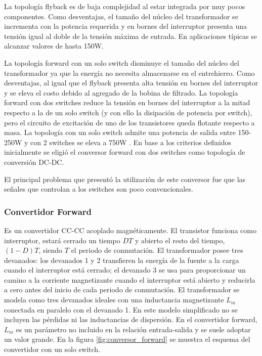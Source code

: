 La topología flyback es de baja complejidad al estar integrada por muy pocos componentes. 
Como desventajas, el tamaño del núcleo del transformador se incrementa con la potencia requerida y en bornes del
interruptor presenta una tensión igual al doble de la tensión máxima de entrada.
En aplicaciones típicas se alcanzar valores de hasta 150W.

La topología forward con un solo switch disminuye el tamaño del núcleo del transformador ya que la energía no necesita almacenarse en el entrehierro.
Como desventajas, al igual que el flyback presenta alta tensión en bornes del interruptor y se eleva el costo debido al agregado de la bobina de filtrado.
La topología forward con dos switches reduce la tensión en bornes del interruptor a la mitad respecto a la de un solo switch (y con ello la disipación de potencia por switch), 
pero el circuito de excitación de uno de los transistores queda flotante respecto a masa. 
La topología con un solo switch admite una potencia de salida entre 150-250W y con 2 switches se eleva a 750W \cite{mohan}\cite{hart}. 
En base a los criterios definidos inicialmente se eligió el conversor forward con dos switches como topología de conversión DC-DC. 

El principal problema que presentó la utilización de este conversor fue que las señales que controlan a los switches son poco convencionales.

\subsubsection{Convertidor Forward}

Es un convertidor CC-CC acoplado magnéticamente. El transistor funciona como interruptor, estará cerrado un tiempo $DT$ y abierto el resto del tiempo,
$(1 - D)T$, siendo $T$ el periodo de conmutación. 
El transformador posee tres devanados: los devanados 1 y 2 transfieren la energía de la
fuente a la carga cuando el interruptor está cerrado; el devanado 3 se usa para proporcionar un
camino a la corriente magnetizante cuando el interruptor está abierto y reducirla a cero antes del
inicio de cada periodo de conmutación. El transformador se modela como tres devanados ideales
con una inductancia magnetizante $L_m$ conectada en paralelo con el devanado 1. En este modelo simplificado no se incluyen las pérdidas ni las inductancias de dispersión.
En el convertidor forward, $L_m$ es un parámetro no incluido en la relación entrada-salida y se suele adoptar un valor grande.
En la figura \ref{fig:conversor_forward} se muestra el esquema del convertidor con un solo switch.

